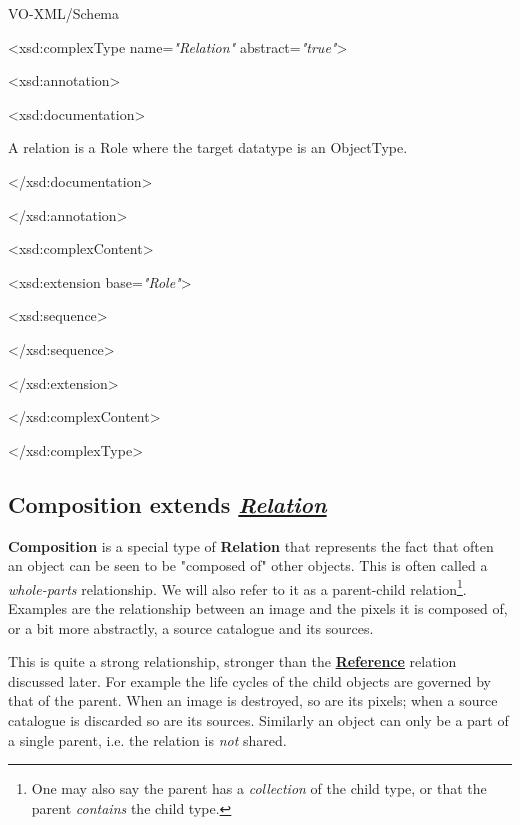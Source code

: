 \documentclass[10pt,a4paper]{ivoa}
\begin{document}
VO-XML/Schema

\textless xsd:complexType name=\emph{"Relation"}
abstract=\emph{"true"}\textgreater{}

\textless xsd:annotation\textgreater{}

\textless xsd:documentation\textgreater{}

A relation is a Role where the target datatype is an ObjectType.

\textless/xsd:documentation\textgreater{}

\textless/xsd:annotation\textgreater{}

\textless xsd:complexContent\textgreater{}

\textless xsd:extension base=\emph{"Role"}\textgreater{}

\textless xsd:sequence\textgreater{}

\textless/xsd:sequence\textgreater{}

\textless/xsd:extension\textgreater{}

\textless/xsd:complexContent\textgreater{}

\textless/xsd:complexType\textgreater{}

\hypertarget{composition-extends-relation}{%
\subsection{\texorpdfstring{Composition extends
\protect\hyperlink{relation-extends-role}{\emph{Relation}}}{Composition extends Relation}}\label{composition-extends-relation}}

\textbf{Composition} is a special type of \textbf{Relation} that
represents the fact that often an object can be seen to be "composed of"
other objects. This is often called a \emph{whole-parts} relationship.
We will also refer to it as a parent-child relation\footnote{One may
  also say the parent has a \emph{collection} of the child type, or that
  the parent \emph{contains} the child type.}. Examples are the
relationship between an image and the pixels it is composed of, or a bit
more abstractly, a source catalogue and its sources.

This is quite a strong relationship, stronger than the
\protect\hyperlink{reference-extends-relation}{\textbf{Reference}}
relation discussed later. For example the life cycles of the child
objects are governed by that of the parent. When an image is destroyed,
so are its pixels; when a source catalogue is discarded so are its
sources. Similarly an object can only be a part of a single parent, i.e.
the relation is \emph{not} shared.
\end{document}
